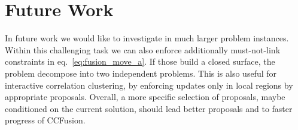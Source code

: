 \documentclass[10pt,twocolumn,letterpaper]{article}
\theoremstyle{definition}
\begin{document}
%






% 



%


\section{Future Work}\label{sec:future}
In future work we would like to investigate in much larger problem instances.
Within this challenging task we can also enforce additionally must-not-link constraints in eq.~\ref{eq:fusion_move_a}.
If those build a closed surface, the problem decompose into two independent problems.
This is also useful for interactive correlation clustering, by enforcing
updates only in local regions by appropriate proposals.
Overall, a more specific selection of proposals, maybe conditioned on the current solution,
should lead better proposals and to faster progress of CCFusion.
\end{document}
